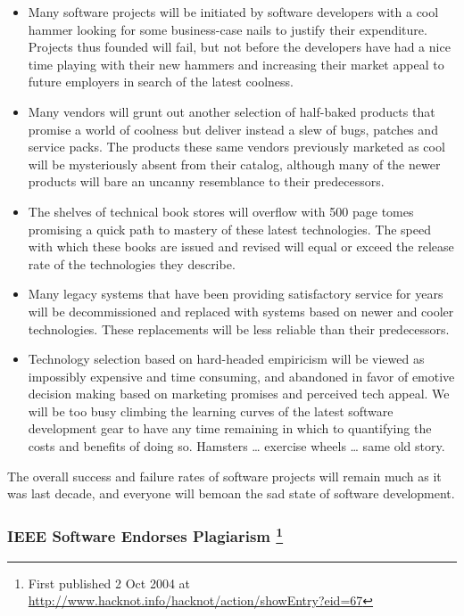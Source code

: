 \documentclass{article}
\begin{document}
\begin{enumerate}
\begin{itemize}
\item Many software projects will be initiated by software developers with
a cool hammer looking for some business-case nails to justify their
expenditure. Projects thus founded will fail, but not before the
developers have had a nice time playing with their new hammers and
increasing their market appeal to future employers in search of the
latest coolness.\\
\item Many vendors will grunt out another selection of half-baked products
that promise a world of coolness but deliver instead a slew of bugs,
patches and service packs. The products these same vendors previously
marketed as cool will be mysteriously absent from their catalog,
although many of the newer products will bare an uncanny resemblance
to their predecessors.\\
\item The shelves of technical book stores will overflow with 500 page
tomes promising a quick path to mastery of these latest technologies.
The speed with which these books are issued and revised will equal or
exceed the release rate of the technologies they describe.\\
\item Many legacy systems that have been providing satisfactory service for
years will be decommissioned and replaced with systems based on newer
and cooler technologies. These replacements will be less reliable
than their predecessors.\\
\item Technology selection based on hard-headed empiricism will be viewed
as impossibly expensive and time consuming, and abandoned in favor of
emotive decision making based on marketing promises and perceived
tech appeal. We will be too busy climbing the learning curves of the
latest software development gear to have any time remaining in which
to quantifying the costs and benefits of doing so. Hamsters \ldots{}
exercise wheels \ldots{} same old story.
\end{itemize}

The overall success and failure rates of software projects will remain
much as it was last decade, and everyone will bemoan the sad state of
software development.
\end{enumerate}

\subsubsection{IEEE Software Endorses Plagiarism \footnote{First published 2 Oct 2004 at
\url{http://www.hacknot.info/hacknot/action/showEntry?eid=67}}}
\label{sec:orgheadline415}
\end{document}
